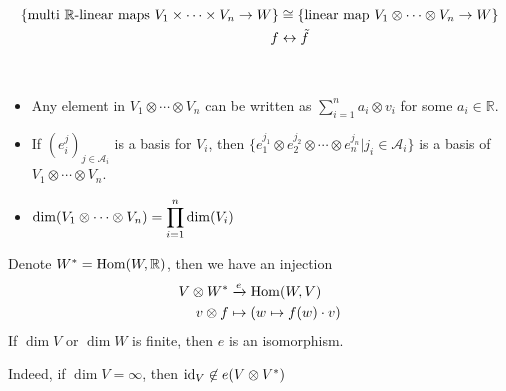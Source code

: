 \begin{corollary}
    \begin{equation}
        \begin{aligned}
            \{\text{multi  $ \mathbb{R} $-linear maps }V_1\times \cdots \times V_n\rightarrow W\}&\cong \{\text{linear map }V_1\otimes \cdots \otimes V_n\rightarrow W\}\\
            f&\leftrightarrow \tilde{f}
        \end{aligned}
    \end{equation}
\end{corollary}
\begin{proposition}
    \,\begin{itemize}
        \item Any element in  $ V_1\otimes \cdots \otimes V_n $ can be written as  $ \sum_{i=1}^n a_i\otimes v_i $ for some  $ a_i\in\mathbb{R} $.
        \item If  $ (e_i^j)_{j\in \mathcal{A}_i} $ is a basis for  $ V_i $, then  $ \{e_1^{j_1}\otimes e_2^{j_2}\otimes \cdots \otimes e_{n}^{j_n}|j_i\in \mathcal{A}_i\} $ is a basis of  $ V_1\otimes \cdots \otimes V_n $.
        \item  $ \dim (V_1\otimes \cdots \otimes V_n)=\displaystyle\prod_{i=1}^n \dim(V_i) $    
    \end{itemize}
\end{proposition}
\begin{proposition}
    Denote  $ W^*=\mathrm{Hom}(W,\mathbb{R}) $, then  we have an injection 
    \begin{equation}
        \begin{aligned}
            V\otimes W^*&\xrightarrow{e}\mathrm{Hom}(W,V)\\
            v\otimes f&\mapsto \left(w\mapsto f(w)\cdot v\right) 
        \end{aligned}
    \end{equation}
    If  $ \dim V $ or  $ \dim W $ is finite, then  $ e $ is an isomorphism.
    
    Indeed, if  $ \dim V=\infty $, then  $ \mathrm{id}_V\not\in e(V\otimes V^*) $  
\end{proposition}

